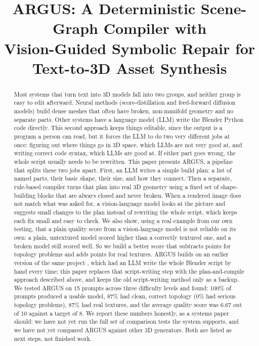 \documentclass[conference]{IEEEtran}
\begin{document}
\title{ARGUS: A Deterministic Scene-Graph Compiler with\\Vision-Guided Symbolic Repair for Text-to-3D Asset Synthesis}

\author{
}

\maketitle

\begin{abstract}
Most systems that turn text into 3D models fall into two groups, and neither group is easy to edit afterward. Neural methods (score-distillation and feed-forward diffusion models) build dense meshes that often have broken, non-manifold geometry and no separate parts. Other systems have a language model (LLM) write the Blender Python code directly. This second approach keeps things editable, since the output is a program a person can read, but it forces the LLM to do two very different jobs at once: figuring out where things go in 3D space, which LLMs are not very good at, and writing correct code syntax, which LLMs are good at. If either part goes wrong, the whole script usually needs to be rewritten. This paper presents ARGUS, a pipeline that splits these two jobs apart. First, an LLM writes a simple build plan: a list of named parts, their basic shape, their size, and how they connect. Then a separate, rule-based compiler turns that plan into real 3D geometry using a fixed set of shape-building blocks that are always closed and never broken. When a rendered image does not match what was asked for, a vision-language model looks at the picture and suggests small changes to the plan instead of rewriting the whole script, which keeps each fix small and easy to check. We also show, using a real example from our own testing, that a plain quality score from a vision-language model is not reliable on its own: a plain, untextured model scored higher than a correctly textured one, and a broken model still scored well. So we build a better score that subtracts points for topology problems and adds points for real textures. ARGUS builds on an earlier version of the same project \cite{dahal2026thesis}, which had an LLM write the whole Blender script by hand every time; this paper replaces that script-writing step with the plan-and-compile approach described above, and keeps the old script-writing method only as a backup. We tested ARGUS on 15 prompts across three difficulty levels and found: 100\% of prompts produced a usable model, 87\% had clean, correct topology (0\% had serious topology problems), 87\% had real textures, and the average quality score was 6.67 out of 10 against a target of 8. We report these numbers honestly, as a systems paper should: we have not yet run the full set of comparison tests the system supports, and we have not yet compared ARGUS against other 3D generators. Both are listed as next steps, not finished work.

\end{abstract}
\end{document}

